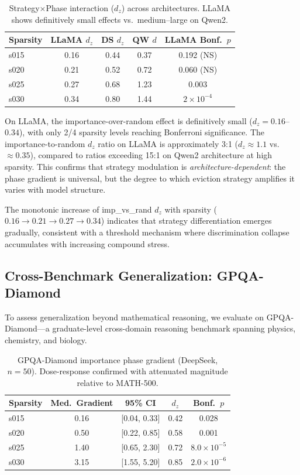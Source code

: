 \documentclass[11pt,a4paper]{article}
\begin{document}
\begin{table}[t]
\centering
\small
\caption{Strategy$\times$Phase interaction ($d_z$) across architectures. LLaMA shows definitively small effects vs.\ medium--large on Qwen2.}
\label{tab:imp_vs_rand}
\begin{tabular}{lcccc}
\toprule
Sparsity & LLaMA $d_z$ & DS $d_z$ & QW $d$ & LLaMA Bonf.\ $p$ \\
\midrule
s015 & 0.16 & 0.44 & 0.37 & 0.192 (NS) \\
s020 & 0.21 & 0.52 & 0.72 & 0.060 (NS) \\
s025 & 0.27 & 0.68 & 1.23 & 0.003 \\
s030 & 0.34 & 0.80 & 1.44 & $2 \times 10^{-4}$ \\
\bottomrule
\end{tabular}
\end{table}

On LLaMA, the importance-over-random effect is definitively small ($d_z = 0.16$--$0.34$), with only 2/4 sparsity levels reaching Bonferroni significance. The importance-to-random $d_z$ ratio on LLaMA is approximately 3:1 ($d_z \approx 1.1$ vs.\ $\approx 0.35$), compared to ratios exceeding 15:1 on Qwen2 architecture at high sparsity. This confirms that strategy modulation is \emph{architecture-dependent}: the phase gradient is universal, but the degree to which eviction strategy amplifies it varies with model structure.

The monotonic increase of imp\_vs\_rand $d_z$ with sparsity ($0.16 \to 0.21 \to 0.27 \to 0.34$) indicates that strategy differentiation emerges gradually, consistent with a threshold mechanism where discrimination collapse accumulates with increasing compound stress.

\subsection{Cross-Benchmark Generalization: GPQA-Diamond}
\label{sec:gpqa}

To assess generalization beyond mathematical reasoning, we evaluate on GPQA-Diamond---a graduate-level cross-domain reasoning benchmark spanning physics, chemistry, and biology.

\begin{table}[t]
\centering
\small
\caption{GPQA-Diamond importance phase gradient (DeepSeek, $n=50$). Dose-response confirmed with attenuated magnitude relative to MATH-500.}
\label{tab:gpqa_importance}
\begin{tabular}{lcccc}
\toprule
Sparsity & Med.\ Gradient & 95\% CI & $d_z$ & Bonf.\ $p$ \\
\midrule
s015 & 0.16 & [0.04, 0.33] & 0.42 & 0.028 \\
s020 & 0.50 & [0.22, 0.85] & 0.58 & 0.001 \\
s025 & 1.40 & [0.65, 2.30] & 0.72 & $8.0 \times 10^{-5}$ \\
s030 & 3.15 & [1.55, 5.20] & 0.85 & $2.0 \times 10^{-6}$ \\
\bottomrule
\end{tabular}
\end{table}
\end{document}
